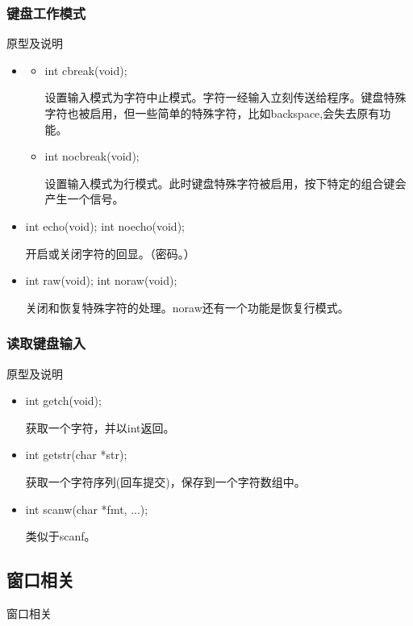 \documentclass{beamer}
\begin{document}
\begin{frame}
\frametitle{键盘工作模式}

\begin{block}{原型及说明}
\begin{itemize}
\item
\begin{itemize}
\item
int cbreak(void);

设置输入模式为字符中止模式。字符一经输入立刻传送给程序。键盘特殊字符也被启用，但一些简单的特殊字符，比如backspace,会失去原有功能。
\item
int nocbreak(void);

设置输入模式为行模式。此时键盘特殊字符被启用，按下特定的组合键会产生一个信号。
\end{itemize}
\item
int echo(void);
int noecho(void);

开启或关闭字符的回显。（密码。）
\item
int raw(void);
int noraw(void);

关闭和恢复特殊字符的处理。noraw还有一个功能是恢复行模式。

\end{itemize}
\end{block}

\end{frame}
\begin{frame}
\frametitle{读取键盘输入}

\begin{block}{原型及说明}
\begin{itemize}
\item
int getch(void);

获取一个字符，并以int返回。
\item
int getstr(char *str);

获取一个字符序列(回车提交)，保存到一个字符数组中。
\item
int scanw(char *fmt, ...);

类似于scanf。

\end{itemize}
\end{block}

\end{frame}


\subsection{窗口相关}
\begin{frame}
\Huge{\centerline{窗口相关}}
\end{frame}
\end{document}
